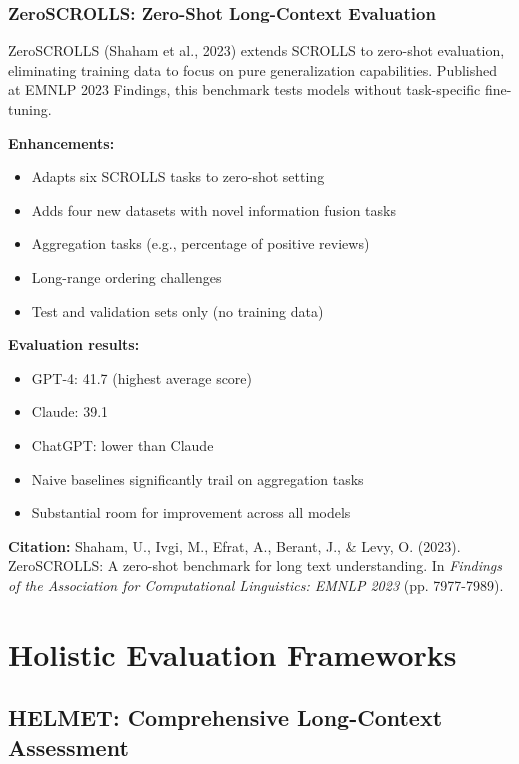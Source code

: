 \documentclass[11pt]{article}
\begin{document}
\subsubsection{ZeroSCROLLS: Zero-Shot Long-Context Evaluation}

ZeroSCROLLS (Shaham et al., 2023) extends SCROLLS to zero-shot evaluation, eliminating training data to focus on pure generalization capabilities. Published at EMNLP 2023 Findings, this benchmark tests models without task-specific fine-tuning.

\textbf{Enhancements:}
\begin{itemize}[leftmargin=*]
    \item Adapts six SCROLLS tasks to zero-shot setting
    \item Adds four new datasets with novel information fusion tasks
    \item Aggregation tasks (e.g., percentage of positive reviews)
    \item Long-range ordering challenges
    \item Test and validation sets only (no training data)
\end{itemize}

\textbf{Evaluation results:}
\begin{itemize}[leftmargin=*]
    \item GPT-4: 41.7 (highest average score)
    \item Claude: 39.1
    \item ChatGPT: lower than Claude
    \item Naive baselines significantly trail on aggregation tasks
    \item Substantial room for improvement across all models
\end{itemize}

\textbf{Citation:} Shaham, U., Ivgi, M., Efrat, A., Berant, J., \& Levy, O. (2023). ZeroSCROLLS: A zero-shot benchmark for long text understanding. In \textit{Findings of the Association for Computational Linguistics: EMNLP 2023} (pp. 7977-7989).

\section{Holistic Evaluation Frameworks}

\subsection{HELMET: Comprehensive Long-Context Assessment}
\end{document}
